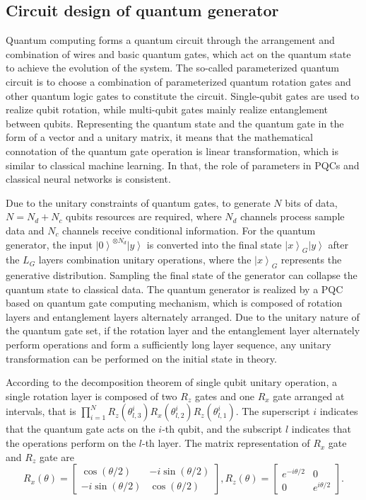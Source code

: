\documentclass{bmcart}
\begin{document}
\subsection{Circuit design of quantum generator}
Quantum computing forms a quantum circuit through the arrangement and combination of wires and basic quantum gates, which act on the quantum state to achieve the evolution of the system. The so-called parameterized quantum circuit is to choose a combination of parameterized quantum rotation gates and other quantum logic gates to constitute the circuit. Single-qubit gates are used to realize qubit rotation, while multi-qubit gates mainly realize entanglement between qubits. Representing the quantum state and the quantum gate in the form of a vector and a unitary matrix, it means that the mathematical connotation of the quantum gate operation is linear transformation, which is similar to classical machine learning. In that, the role of parameters in PQCs and classical neural networks is consistent.


Due to the unitary constraints of quantum gates, to generate $N$ bits of data, $N = {N_d} + {N_c}$ qubits resources are required, where ${N_d}$ channels process sample data and ${N_c}$ channels receive conditional information. For the quantum generator, the input ${\left| 0 \right\rangle ^{ \otimes {N_d}}}\left| y \right\rangle $ is converted into the final state ${\left| x \right\rangle _G}\left| y \right\rangle $ after the ${L_G}$ layers combination unitary operations, where the ${\left| x \right\rangle _G}$ represents the generative distribution. Sampling the final state of the generator can collapse the quantum state to classical data. The quantum generator is realized by a PQC based on quantum gate computing mechanism, which is composed of rotation layers and entanglement layers alternately arranged. Due to the unitary nature of the quantum gate set, if the rotation layer and the entanglement layer alternately perform operations and form a sufficiently long layer sequence, any unitary transformation can be performed on the initial state in theory.


According to the decomposition theorem of single qubit unitary operation, a single rotation layer is composed of two $R_z$ gates and one $R_x$ gate arranged at intervals, that is $\prod\limits_{i = 1}^N {R_z^{}\left( {\theta _{l,3}^i} \right)R_x^{}\left( {\theta _{l,2}^i} \right)R_z^{}\left( {\theta _{l,1}^i} \right)} $. The superscript $i$ indicates that the quantum gate acts on the $i$-th qubit, and the subscript $l$ indicates that the operations perform on the $l$-th layer. The matrix representation of $R_x$ gate and $R_z$ gate are
%
\[{R_x}\left( \theta  \right) = \left[ {\begin{array}{*{20}{c}}
{\cos \left( {\theta /2} \right)}&{ - i\sin \left( {\theta /2} \right)}\\
{ - i\sin \left( {\theta /2} \right)}&{\cos \left( {\theta /2} \right)}
\end{array}} \right],{R_z}\left( \theta  \right) = \left[ {\begin{array}{*{20}{c}}
{{e^{ - i\theta /2}}}&0\\
0&{{e^{i\theta /2}}}
\end{array}} \right].\]
%
\end{document}
